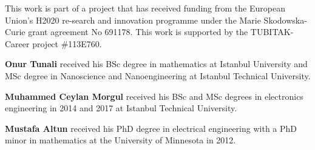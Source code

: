 \documentclass[9pt]{ieeeMicro}
\begin{document}

%
%
%
%


\begin{acknowledgement}	
	
This work is part of a project that has received funding from the European Union’s H2020 re-search and innovation programme under the Marie Skodowska-Curie grant agreement No 691178. This work is supported by the TUBITAK-Career project \#113E760.	

\end{acknowledgement}




\begin{about}		
	
\textbf{Onur Tunali} received his BSc degree in mathematics at Istanbul University and MSc degree in Nanoscience and Nanoengineering at Istanbul Technical University. 

\textbf{Muhammed Ceylan Morgul} received his BSc and MSc degrees in electronics engineering in 2014 and 2017 at Istanbul Technical University. 

\textbf{Mustafa Altun} received his PhD degree in electrical engineering with a PhD minor in mathematics at the University of Minnesota in 2012. 

\end{about}
\end{document}
